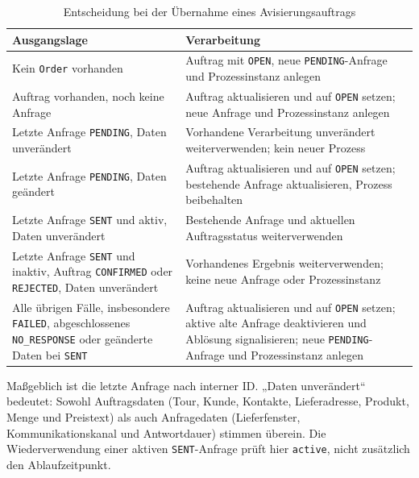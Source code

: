 \begin{table}[htbp]
  \centering
  \caption{Entscheidung bei der Übernahme eines Avisierungsauftrags}
  \label{tab:avisierungsauftrag-entscheidung}
  \small
  \setlength{\tabcolsep}{5pt}
  \begin{tabularx}{\textwidth}{@{}>{\raggedright\arraybackslash}p{}>{\raggedright\arraybackslash}X@{}}
    \toprule
    Ausgangslage & Verarbeitung \\
    \midrule
    Kein \texttt{Order} vorhanden
      & Auftrag mit \texttt{OPEN}, neue \texttt{PENDING}-Anfrage und Prozessinstanz anlegen \\
    Auftrag vorhanden, noch keine Anfrage
      & Auftrag aktualisieren und auf \texttt{OPEN} setzen; neue Anfrage und Prozessinstanz anlegen \\
    Letzte Anfrage \texttt{PENDING}, Daten unverändert
      & Vorhandene Verarbeitung unverändert weiterverwenden; kein neuer Prozess \\
    Letzte Anfrage \texttt{PENDING}, Daten geändert
      & Auftrag aktualisieren und auf \texttt{OPEN} setzen; bestehende Anfrage aktualisieren, Prozess beibehalten \\
    Letzte Anfrage \texttt{SENT} und aktiv, Daten unverändert
      & Bestehende Anfrage und aktuellen Auftragsstatus weiterverwenden \\
    Letzte Anfrage \texttt{SENT} und inaktiv, Auftrag \texttt{CONFIRMED} oder \texttt{REJECTED}, Daten unverändert
      & Vorhandenes Ergebnis weiterverwenden; keine neue Anfrage oder Prozessinstanz \\
    Alle übrigen Fälle, insbesondere \texttt{FAILED}, abgeschlossenes \texttt{NO\_RESPONSE} oder geänderte Daten bei \texttt{SENT}
      & Auftrag aktualisieren und auf \texttt{OPEN} setzen; aktive alte Anfrage deaktivieren und Ablösung signalisieren; neue \texttt{PENDING}-Anfrage und Prozessinstanz anlegen \\
    \bottomrule
  \end{tabularx}
  \par\smallskip
  \begin{minipage}{\textwidth}
    \footnotesize
    Maßgeblich ist die letzte Anfrage nach interner ID. „Daten unverändert“
    bedeutet: Sowohl Auftragsdaten (Tour, Kunde, Kontakte, Lieferadresse,
    Produkt, Menge und Preistext) als auch Anfragedaten (Lieferfenster,
    Kommunikationskanal und Antwortdauer) stimmen überein.
    Die Wiederverwendung einer aktiven \texttt{SENT}-Anfrage prüft hier
    \texttt{active}, nicht zusätzlich den Ablaufzeitpunkt.
  \end{minipage}
\end{table}


